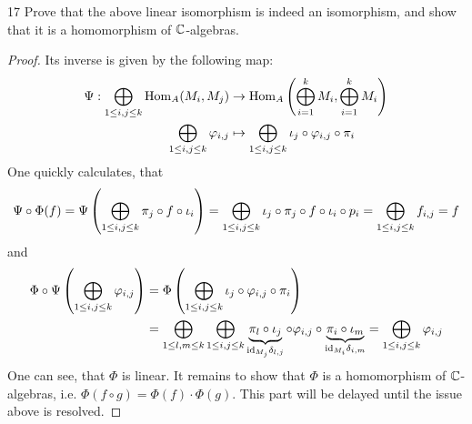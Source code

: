 \documentclass[twoside = false,	%
		headsepline,		%
		parskip = true,
		]{scrbook}						%
\begin{document}
        \begin{exercise}{}{17}
            Prove that the above linear isomorphism is indeed an isomorphism, and show that it is a homomorphism of $\mathbb C$-algebras.
        \end{exercise}
        \begin{proof}
            Its inverse is given by the following map:
            \begin{equation*}
            \begin{split}
                \Psi: \bigoplus_{1 \leq i,j \leq k} \mathrm{Hom}_A(M_i,M_j) &\to \mathrm{Hom}_A\left( \bigoplus_{i=1}^k M_i,\bigoplus_{i=1}^k M_i\right) \\
                \bigoplus_{1 \leq i,j \leq k} \varphi_{i,j} & \mapsto \bigoplus_{1 \leq i,j \leq k} \iota_j \circ \varphi_{i,j} \circ \pi_i
            \end{split}
            \end{equation*}
            One quickly calculates, that
            \begin{equation*}
                \Psi \circ \Phi (f) = \Psi \left( \bigoplus_{1 \leq i,j \leq k} \pi_j \circ f \circ \iota_i\right) = \bigoplus_{1 \leq i,j \leq k} \iota_j \circ \pi_j \circ f \circ \iota_i \circ p_i = \bigoplus_{1 \leq i,j \leq k} f_{i,j} = f
            \end{equation*}
            and
            \begin{equation*}
            \begin{split}
                \Phi \circ \Psi \left( \bigoplus_{1 \leq i,j \leq k} \varphi_{i,j}\right) &= \Phi \left( \bigoplus_{1 \leq i,j \leq k} \iota_j \circ \varphi_{i,j} \circ \pi_i\right) \\
                &= \bigoplus_{1 \leq l,m \leq k}  \bigoplus_{1 \leq i,j \leq k} \underbrace{\pi_l \circ \iota_j}_{\mathrm{id}_{M_j} \delta_{l,j}} \circ \varphi_{i,j} \circ \underbrace{\pi_i \circ \iota_m}_{\mathrm{id}_{M_i} \delta_{i,m}} 
                = \bigoplus_{1 \leq i,j \leq k} \varphi_{i,j}
            \end{split}
            \end{equation*}
            One can see, that $\Phi$ is linear. It remains to show that $\Phi$ is a homomorphism of $\mathbb C$-algebras, i.e. $\Phi(f \circ g) = \Phi(f) \cdot \Phi(g)$. This part will be delayed until the issue above is resolved.
        \end{proof}
\end{document}
